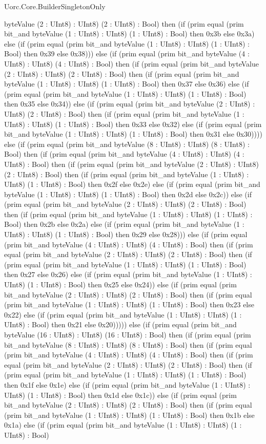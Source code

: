 \begin{lexlean}{Uorc.Core.BuilderSingletonOnly}
\begin{semanticmodule}
{byteValue (2 : UInt8) : UInt8) (2 : UInt8) : Bool) then (if (prim equal (prim bit_and byteValue (1 : UInt8) : UInt8) (1 : UInt8) : Bool) then 0x3b else 0x3a) else (if (prim equal (prim bit_and byteValue (1 : UInt8) : UInt8) (1 : UInt8) : Bool) then 0x39 else 0x38))) else (if (prim equal (prim bit_and byteValue (4 : UInt8) : UInt8) (4 : UInt8) : Bool) then (if (prim equal (prim bit_and byteValue (2 : UInt8) : UInt8) (2 : UInt8) : Bool) then (if (prim equal (prim bit_and byteValue (1 : UInt8) : UInt8) (1 : UInt8) : Bool) then 0x37 else 0x36) else (if (prim equal (prim bit_and byteValue (1 : UInt8) : UInt8) (1 : UInt8) : Bool) then 0x35 else 0x34)) else (if (prim equal (prim bit_and byteValue (2 : UInt8) : UInt8) (2 : UInt8) : Bool) then (if (prim equal (prim bit_and byteValue (1 : UInt8) : UInt8) (1 : UInt8) : Bool) then 0x33 else 0x32) else (if (prim equal (prim bit_and byteValue (1 : UInt8) : UInt8) (1 : UInt8) : Bool) then 0x31 else 0x30)))) else (if (prim equal (prim bit_and byteValue (8 : UInt8) : UInt8) (8 : UInt8) : Bool) then (if (prim equal (prim bit_and byteValue (4 : UInt8) : UInt8) (4 : UInt8) : Bool) then (if (prim equal (prim bit_and byteValue (2 : UInt8) : UInt8) (2 : UInt8) : Bool) then (if (prim equal (prim bit_and byteValue (1 : UInt8) : UInt8) (1 : UInt8) : Bool) then 0x2f else 0x2e) else (if (prim equal (prim bit_and byteValue (1 : UInt8) : UInt8) (1 : UInt8) : Bool) then 0x2d else 0x2c)) else (if (prim equal (prim bit_and byteValue (2 : UInt8) : UInt8) (2 : UInt8) : Bool) then (if (prim equal (prim bit_and byteValue (1 : UInt8) : UInt8) (1 : UInt8) : Bool) then 0x2b else 0x2a) else (if (prim equal (prim bit_and byteValue (1 : UInt8) : UInt8) (1 : UInt8) : Bool) then 0x29 else 0x28))) else (if (prim equal (prim bit_and byteValue (4 : UInt8) : UInt8) (4 : UInt8) : Bool) then (if (prim equal (prim bit_and byteValue (2 : UInt8) : UInt8) (2 : UInt8) : Bool) then (if (prim equal (prim bit_and byteValue (1 : UInt8) : UInt8) (1 : UInt8) : Bool) then 0x27 else 0x26) else (if (prim equal (prim bit_and byteValue (1 : UInt8) : UInt8) (1 : UInt8) : Bool) then 0x25 else 0x24)) else (if (prim equal (prim bit_and byteValue (2 : UInt8) : UInt8) (2 : UInt8) : Bool) then (if (prim equal (prim bit_and byteValue (1 : UInt8) : UInt8) (1 : UInt8) : Bool) then 0x23 else 0x22) else (if (prim equal (prim bit_and byteValue (1 : UInt8) : UInt8) (1 : UInt8) : Bool) then 0x21 else 0x20))))) else (if (prim equal (prim bit_and byteValue (16 : UInt8) : UInt8) (16 : UInt8) : Bool) then (if (prim equal (prim bit_and byteValue (8 : UInt8) : UInt8) (8 : UInt8) : Bool) then (if (prim equal (prim bit_and byteValue (4 : UInt8) : UInt8) (4 : UInt8) : Bool) then (if (prim equal (prim bit_and byteValue (2 : UInt8) : UInt8) (2 : UInt8) : Bool) then (if (prim equal (prim bit_and byteValue (1 : UInt8) : UInt8) (1 : UInt8) : Bool) then 0x1f else 0x1e) else (if (prim equal (prim bit_and byteValue (1 : UInt8) : UInt8) (1 : UInt8) : Bool) then 0x1d else 0x1c)) else (if (prim equal (prim bit_and byteValue (2 : UInt8) : UInt8) (2 : UInt8) : Bool) then (if (prim equal (prim bit_and byteValue (1 : UInt8) : UInt8) (1 : UInt8) : Bool) then 0x1b else 0x1a) else (if (prim equal (prim bit_and byteValue (1 : UInt8) : UInt8) (1 : UInt8) : Bool) }
\end{semanticmodule}
\end{lexlean}
